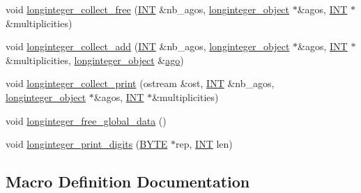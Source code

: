 \begin{DoxyCompactItemize}
\item 
void \mbox{\hyperlink{longinteger__domain_8_c_abd87ca5c5c3cb4f6e2c50ae5ad86b40b}{longinteger\+\_\+collect\+\_\+free}} (\mbox{\hyperlink{galois_8h_a09fddde158a3a20bd2dcadb609de11dc}{I\+NT}} \&nb\+\_\+agos, \mbox{\hyperlink{classlonginteger__object}{longinteger\+\_\+object}} $\ast$\&agos, \mbox{\hyperlink{galois_8h_a09fddde158a3a20bd2dcadb609de11dc}{I\+NT}} $\ast$\&multiplicities)
\item 
void \mbox{\hyperlink{longinteger__domain_8_c_a158ce9f92cb6530e92630bb15a7b6734}{longinteger\+\_\+collect\+\_\+add}} (\mbox{\hyperlink{galois_8h_a09fddde158a3a20bd2dcadb609de11dc}{I\+NT}} \&nb\+\_\+agos, \mbox{\hyperlink{classlonginteger__object}{longinteger\+\_\+object}} $\ast$\&agos, \mbox{\hyperlink{galois_8h_a09fddde158a3a20bd2dcadb609de11dc}{I\+NT}} $\ast$\&multiplicities, \mbox{\hyperlink{classlonginteger__object}{longinteger\+\_\+object}} \&\mbox{\hyperlink{nauty_8h_a8d80b254be0a99465af6ccfde50dbfcc}{ago}})
\item 
void \mbox{\hyperlink{longinteger__domain_8_c_ab055dba67992bb4d67cc93e9749532c2}{longinteger\+\_\+collect\+\_\+print}} (ostream \&ost, \mbox{\hyperlink{galois_8h_a09fddde158a3a20bd2dcadb609de11dc}{I\+NT}} \&nb\+\_\+agos, \mbox{\hyperlink{classlonginteger__object}{longinteger\+\_\+object}} $\ast$\&agos, \mbox{\hyperlink{galois_8h_a09fddde158a3a20bd2dcadb609de11dc}{I\+NT}} $\ast$\&multiplicities)
\item 
void \mbox{\hyperlink{longinteger__domain_8_c_a6160ced6b3ffc2765c111f7d4f94ed42}{longinteger\+\_\+free\+\_\+global\+\_\+data}} ()
\item 
void \mbox{\hyperlink{longinteger__domain_8_c_ac2bac7b12f5b6440b8dad275cd7a157d}{longinteger\+\_\+print\+\_\+digits}} (\mbox{\hyperlink{galois_8h_ab6cc7b4aeb6ea31aba2b3fbfc83ff5e6}{B\+Y\+TE}} $\ast$rep, \mbox{\hyperlink{galois_8h_a09fddde158a3a20bd2dcadb609de11dc}{I\+NT}} len)
\end{DoxyCompactItemize}


\subsection{Macro Definition Documentation}
\mbox{\label{longinteger__domain_8_c_aee728adc7a2080866e3b7d0f00fdcae5}} 
